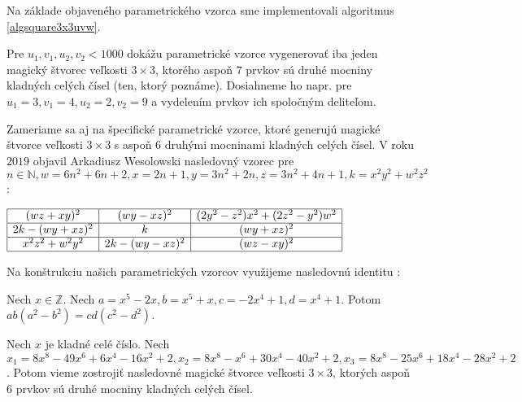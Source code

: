 Na základe objaveného parametrického vzorca sme implementovali algoritmus \ref{algsquare3x3uvw}.

\begin{result} Pre $u_1, v_1, u_2, v_2 < 1000$ dokážu parametrické vzorce vygenerovať iba jeden magický štvorec veľkosti $3 \times 3$, ktorého aspoň $7$ prvkov sú druhé mocniny kladných celých čísel (ten, ktorý poznáme). Dosiahneme ho napr. pre $u_1 = 3, v_1 = 4, u_2 = 2, v_2 = 9$ a vydelením prvkov ich spoločným deliteľom.
\end{result}

Zameriame sa aj na špecifické parametrické vzorce, ktoré generujú magické štvorce veľkosti $3 \times 3$ s aspoň $6$ druhými mocninami kladných celých čísel. V roku $2019$ objavil Arkadiusz Wesolowski nasledovný vzorec pre $n \in \mathbb{N}, w = 6n^2 + 6n + 2, x = 2n + 1, y = 3n^2 + 2n, z = 3n^2 + 4n + 1, k = x^2 y^2 + w^2 z^2$ \cite{multimagie}:

\begin{center}
$\begin{array}{ |c|c|c| } 
\hline
(wz + xy)^2 & (wy - xz)^2 & (2y^2 - z^2)x^2 + (2z^2 - y^2)w^2 \\ 
\hline
2k - (wy + xz)^2 & k & (wy + xz)^2 \\ 
\hline
x^2 z^2 + w^2 y^2 & 2k - (wy - xz)^2 & (wz - xy)^2 \\
\hline
\end{array}$
\end{center}

Na konštrukciu našich parametrických vzorcov využijeme nasledovnú identitu \cite{algebraic}:


\begin{lemma}
\label{square3x3x}
Nech $x \in \mathbb{Z}$. Nech $a = x^5 - 2x, b = x^5 + x, c = -2x^4 + 1, d = x^4 + 1$. Potom $ab(a^2 - b^2) = cd(c^2 - d^2)$.
\end{lemma}

\begin{theorem}
\label{3x3square6squares}
Nech $x$ je kladné celé číslo. Nech $x_1 = 8x^8 - 49x^6 + 6x^4 - 16x^2 + 2, x_2 = 8x^8 - x^6 + 30x^4 - 40x^2 + 2, x_3 = 8x^8 - 25x^6 + 18x^4 - 28x^2 + 2$. Potom vieme zostrojiť nasledovné magické štvorce veľkosti $3 \times 3$, ktorých aspoň $6$ prvkov sú druhé mocniny kladných celých čísel.
\end{theorem}

